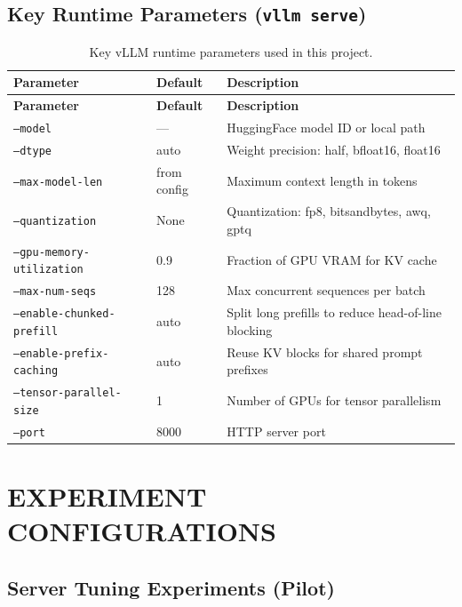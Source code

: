 \documentclass[a4paper,12pt]{report}
\begin{document}
\section{Key Runtime Parameters (\texttt{vllm serve})}

\begin{longtable}{|p{5cm}|p{2.5cm}|p{6cm}|}
\caption{Key vLLM runtime parameters used in this project.} \\
\hline
\textbf{Parameter} & \textbf{Default} & \textbf{Description} \\
\hline
\endfirsthead
\hline
\textbf{Parameter} & \textbf{Default} & \textbf{Description} \\
\hline
\endhead
\texttt{--model} & ---  & HuggingFace model ID or local path \\
\hline
\texttt{--dtype} & auto & Weight precision: half, bfloat16, float16 \\
\hline
\texttt{--max-model-len} & from config & Maximum context length in tokens \\
\hline
\texttt{--quantization} & None & Quantization: fp8, bitsandbytes, awq, gptq \\
\hline
\texttt{--gpu-memory-utilization} & 0.9 & Fraction of GPU VRAM for KV cache \\
\hline
\texttt{--max-num-seqs} & 128 & Max concurrent sequences per batch \\
\hline
\texttt{--enable-chunked-prefill} & auto & Split long prefills to reduce head-of-line blocking \\
\hline
\texttt{--enable-prefix-caching} & auto & Reuse KV blocks for shared prompt prefixes \\
\hline
\texttt{--tensor-parallel-size} & 1 & Number of GPUs for tensor parallelism \\
\hline
\texttt{--port} & 8000 & HTTP server port \\
\hline
\end{longtable}

\chapter{EXPERIMENT CONFIGURATIONS}

\section{Server Tuning Experiments (Pilot)}
\end{document}

